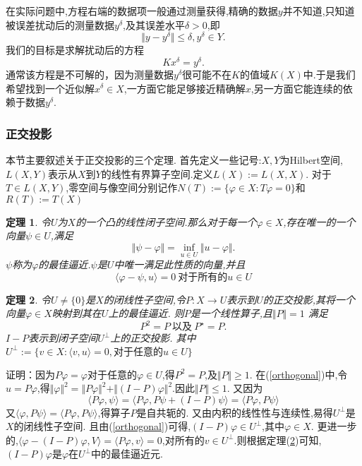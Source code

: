 \documentclass[UTF8]{ctexart}
\numberwithin{equation}{section}
\newtheorem{theorem}{\hspace{2em}定理}[section]
\begin{document}
在实际问题中,方程右端的数据项一般通过测量获得,精确的数据$y$并不知道,只知道被误差扰动后的测量数据$y^{\delta}$,及其误差水平$\delta >0$,即
\begin{equation}
\Vert y-y^{\delta}\Vert \le \delta,y^{\delta}\in Y. 
\end{equation}
我们的目标是求解扰动后的方程
\begin{equation}
Kx^{\delta}=y^{\delta}.
\end{equation}
通常该方程是不可解的，因为测量数据$y^{\delta}$很可能不在$K$的值域$K(X)$中.于是我们希望找到一个近似解$x^{\delta}\in X$,一方面它能足够接近精确解$x$,另一方面它能连续的依赖于数据$y^{\delta}.$

\subsubsection{正交投影}
本节主要叙述关于正交投影的三个定理.
首先定义一些记号:$X,Y$为Hilbert空间,$L(X,Y)$表示从$X$到$Y$的线性有界算子空间.定义$L(X):=L(X,X)$.
对于$T\in L(X,Y)$,零空间与像空间分别记作$N(T):=\{ \varphi \in X:T\varphi =0\}$和$R(T):=T(X)$
\begin{theorem}
令$U$为$X$的一个凸的线性闭子空间.那么对于每一个$\varphi \in X$,存在唯一的一个向量$\psi \in U$,满足
\begin{equation}
\Vert \psi -\varphi \Vert =\inf_{u\in U}\Vert u-\varphi \Vert.
\end{equation}
$\psi$称为$\varphi$的最佳逼近.$\psi$是$U$中唯一满足此性质的向量,并且
\begin{equation}
\langle \varphi -\psi ,u\rangle =0\ \mbox{对于所有的} u\in U   \label{orthogonal}
\end{equation}
\end{theorem}

\begin{theorem} \label{orthogonal theorem}
令$U\ne \{ 0\}$是$X$的闭线性子空间,令$P:X\to U$表示到$U$的正交投影,其将一个向量$\varphi \in X$映射到其在$U$上的最佳逼近.
则$P$是一个线性算子,且$\Vert P\Vert =1$
满足
\begin{equation}
P^{2}=P \ \mbox{以及} \ P^{\star}=P.
\end{equation}
$I-P$表示到闭子空间$U^{\bot}$上的正交投影.
其中$U^{\bot}:=\{v\in X:\langle v,u\rangle =0,\mbox{对于任意的}u\in U\}$
\end{theorem}

证明：因为$P\varphi =\varphi$对于任意的$\varphi \in U$,得$P^{2}=P$,及$\Vert P\Vert \ge 1.$
在(\ref{orthogonal})中,令$u=P\varphi$,得$\Vert \varphi \Vert ^{2}=\Vert P\varphi \Vert ^{2}+\Vert (I-P)\varphi \Vert ^{2}.$因此$\Vert P\Vert \le 1.$
又因为
\begin{equation}
\langle P\varphi ,\psi \rangle =\langle P\varphi ,P\psi +(I-P)\psi \rangle =\langle P\varphi ,P\psi \rangle
\end{equation}
又$\langle \varphi ,P\psi \rangle =\langle P\varphi ,P\psi \rangle$,得算子$P$是自共轭的.
又由内积的线性性与连续性,易得$U^{\bot}$是$X$的闭线性子空间.
且由(\ref{orthogonal})可得,$(I-P)\varphi \in U^{\bot}$,其中$\varphi \in X.$
更进一步的,$\langle \varphi -(I-P)\varphi,V \rangle =\langle P\varphi ,v \rangle =0$,对所有的$v \in U^{\bot}.$则根据定理(\ref{orthogonal theorem})可知,$(I-P)\varphi$是$\varphi$在$U^{\bot}$中的最佳逼近元.
\end{document}
